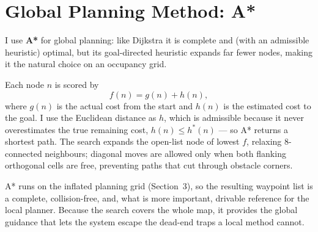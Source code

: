 \section{Global Planning Method: A*}
\label{sec:global}

I use \textbf{A*} for global planning: like Dijkstra it is complete and (with an
admissible heuristic) optimal, but its goal-directed heuristic expands far fewer nodes,
making it the natural choice on an occupancy grid.

Each node $n$ is scored by
\begin{equation}
    f(n) = g(n) + h(n),
\end{equation}
where $g(n)$ is the actual cost from the start and $h(n)$ is the estimated cost to the
goal. I use the Euclidean distance as $h$, which is admissible because it never
overestimates the true remaining cost, $h(n)\le h^*(n)$ --- so A* returns a
shortest path. The search expands the open-list node of lowest $f$, relaxing 8-connected
neighbours; diagonal moves are allowed only when both flanking orthogonal cells are free,
preventing paths that cut through obstacle corners.

A* runs on the inflated planning grid (Section~3), so the resulting waypoint list is a
complete, collision-free, and, what is more important, drivable reference for the local planner. Because the
search covers the whole map, it provides the global guidance that lets the system escape
the dead-end traps a local method cannot.

